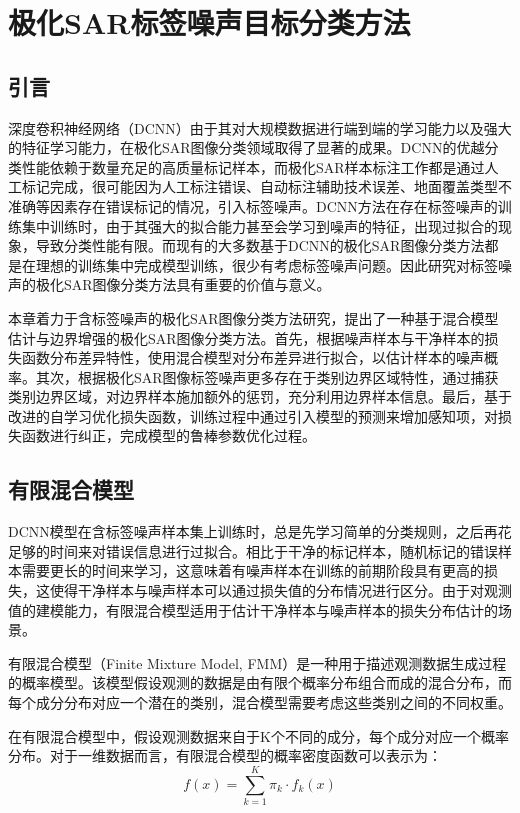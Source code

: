 \chapter{极化SAR标签噪声目标分类方法}
\section{引言}
深度卷积神经网络（DCNN）由于其对大规模数据进行端到端的学习能力以及强大的特征学习能力，在极化SAR图像分类领域取得了显著的成果\citing{}。DCNN的优越分类性能依赖于数量充足的高质量标记样本，而极化SAR样本标注工作都是通过人工标记完成，很可能因为人工标注错误、自动标注辅助技术误差、地面覆盖类型不准确等因素存在错误标记的情况，引入标签噪声\citing{}。DCNN方法在存在标签噪声的训练集中训练时，由于其强大的拟合能力甚至会学习到噪声的特征，出现过拟合的现象，导致分类性能有限\citing{}。而现有的大多数基于DCNN的极化SAR图像分类方法都是在理想的训练集中完成模型训练，很少有考虑标签噪声问题。因此研究对标签噪声的极化SAR图像分类方法具有重要的价值与意义。

本章着力于含标签噪声的极化SAR图像分类方法研究，提出了一种基于混合模型估计与边界增强的极化SAR图像分类方法。首先，根据噪声样本与干净样本的损失函数分布差异特性，使用混合模型对分布差异进行拟合，以估计样本的噪声概率。其次，根据极化SAR图像标签噪声更多存在于类别边界区域特性，通过捕获类别边界区域，对边界样本施加额外的惩罚，充分利用边界样本信息。最后，基于改进的自学习优化损失函数，训练过程中通过引入模型的预测来增加感知项，对损失函数进行纠正，完成模型的鲁棒参数优化过程。

\section{有限混合模型}
DCNN模型在含标签噪声样本集上训练时，总是先学习简单的分类规则，之后再花足够的时间来对错误信息进行过拟合\citing{}。相比于干净的标记样本，随机标记的错误样本需要更长的时间来学习，这意味着有噪声样本在训练的前期阶段具有更高的损失，这使得干净样本与噪声样本可以通过损失值的分布情况进行区分。由于对观测值的建模能力，有限混合模型适用于估计干净样本与噪声样本的损失分布估计的场景。

有限混合模型（Finite Mixture Model, FMM）是一种用于描述观测数据生成过程的概率模型。该模型假设观测的数据是由有限个概率分布组合而成的混合分布，而每个成分分布对应一个潜在的类别，混合模型需要考虑这些类别之间的不同权重。

在有限混合模型中，假设观测数据来自于K个不同的成分，每个成分对应一个概率分布。对于一维数据而言，有限混合模型的概率密度函数可以表示为：
\begin{equation}
    f(x)=\sum_{k=1}^{K}\pi_k \cdot f_k(x)
\end{equation}


